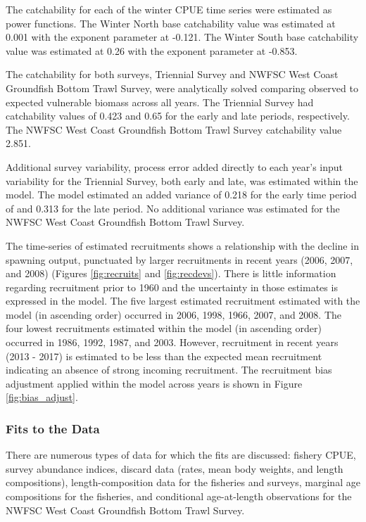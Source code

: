 \documentclass[12pt,]{article}
\begin{document}
The catchability for each of the winter CPUE time series were estimated
as power functions. The Winter North base catchability value was
estimated at 0.001 with the exponent parameter at -0.121. The Winter
South base catchability value was estimated at 0.26 with the exponent
parameter at -0.853.

The catchability for both surveys, Triennial Survey and NWFSC West Coast
Groundfish Bottom Trawl Survey, were analytically solved comparing
observed to expected vulnerable biomass across all years. The Triennial
Survey had catchability values of 0.423 and 0.65 for the early and late
periods, respectively. The NWFSC West Coast Groundfish Bottom Trawl
Survey catchability value 2.851.

Additional survey variability, process error added directly to each
year's input variability for the Triennial Survey, both early and late,
was estimated within the model. The model estimated an added variance of
0.218 for the early time period of and 0.313 for the late period. No
additional variance was estimated for the NWFSC West Coast Groundfish
Bottom Trawl Survey.

The time-series of estimated recruitments shows a relationship with the
decline in spawning output, punctuated by larger recruitments in recent
years (2006, 2007, and 2008) (Figures \ref{fig:recruits} and
\ref{fig:recdevs}). There is little information regarding recruitment
prior to 1960 and the uncertainty in those estimates is expressed in the
model. The five largest estimated recruitment estimated with the model
(in ascending order) occurred in 2006, 1998, 1966, 2007, and 2008. The
four lowest recruitments estimated within the model (in ascending order)
occurred in 1986, 1992, 1987, and 2003. However, recruitment in recent
years (2013 - 2017) is estimated to be less than the expected mean
recruitment indicating an absence of strong incoming recruitment. The
recruitment bias adjustment applied within the model across years is
shown in Figure \ref{fig:bias_adjust}.

\subsubsection{Fits to the Data}\label{fits-to-the-data}

There are numerous types of data for which the fits are discussed:
fishery CPUE, survey abundance indices, discard data (rates, mean body
weights, and length compositions), length-composition data for the
fisheries and surveys, marginal age compositions for the fisheries, and
conditional age-at-length observations for the NWFSC West Coast
Groundfish Bottom Trawl Survey.
\end{document}
